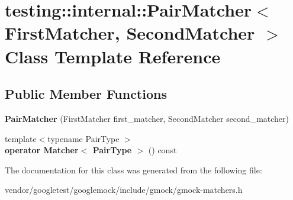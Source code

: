 \hypertarget{classtesting_1_1internal_1_1_pair_matcher}{}\section{testing\+:\+:internal\+:\+:Pair\+Matcher$<$ First\+Matcher, Second\+Matcher $>$ Class Template Reference}
\label{classtesting_1_1internal_1_1_pair_matcher}
\subsection*{Public Member Functions}
\begin{DoxyCompactItemize}
\item 
\mbox{\label{classtesting_1_1internal_1_1_pair_matcher_a84f233a7d90ba33e3f0eb7410783c43c}} 
{\bfseries Pair\+Matcher} (First\+Matcher first\+\_\+matcher, Second\+Matcher second\+\_\+matcher)
\item 
\mbox{\label{classtesting_1_1internal_1_1_pair_matcher_ae9461cc22148c6b15ad94eb5ad7c8a50}} 
{\footnotesize template$<$typename Pair\+Type $>$ }\\{\bfseries operator Matcher$<$ Pair\+Type $>$} () const
\end{DoxyCompactItemize}


The documentation for this class was generated from the following file\+:\begin{DoxyCompactItemize}
\item 
vendor/googletest/googlemock/include/gmock/gmock-\/matchers.\+h\end{DoxyCompactItemize}
